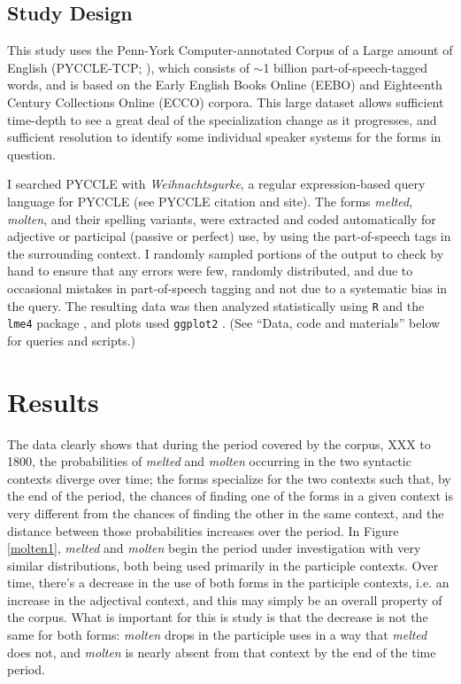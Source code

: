 \documentclass{artikel3}
\begin{document}
\subsection{Study Design}

This study uses the {P}enn-{Y}ork {C}omputer-annotated {C}orpus of a {L}arge amount of {E}nglish  (PYCCLE-TCP; \citealt{pyccle}), which consists of $\sim$1 billion part-of-speech-tagged words, and is based on the Early English Books Online (EEBO) and Eighteenth Century Collections Online (ECCO) corpora. This large dataset allows sufficient time-depth to see a great deal of the specialization change as it progresses, and sufficient resolution to identify some individual speaker systems for the forms in question.

I searched PYCCLE with \textsl{Weihnachtsgurke}, a regular expression-based query language for PYCCLE (see PYCCLE citation and site). The forms \textsl{melted}, \textsl{molten}, and their spelling variants, were extracted and coded automatically for adjective or participal (passive or perfect) use, by using the part-of-speech tags in the surrounding context. I randomly sampled portions of the output to check by hand to ensure that any errors were few, randomly distributed, and due to occasional mistakes in part-of-speech tagging and not due to a systematic bias in the query. The resulting data was then analyzed statistically using \texttt{R} and the \texttt{lme4} package \citep{lme4}, and plots used \texttt{ggplot2} \citep{ggplot2}. (See ``Data, code and materials'' below for queries and scripts.)



\section{Results}
\label{results}

The data clearly shows that during the period covered by the corpus, XXX to 1800, the probabilities of \textsl{melted} and \textsl{molten} occurring in the two syntactic contexts diverge over time; the forms specialize for the two contexts such that, by the end of the period, the chances of finding one of the forms in a given context is very different from the chances of finding the other in the same context, and the distance between those probabilities increases over the period. In Figure \ref{molten1}, \textsl{melted} and \textsl{molten} begin the period under investigation with very similar distributions, both being used primarily in the participle contexts. Over time, there's a decrease in the use of both forms in the participle contexts, i.e. an increase in the adjectival context, and this may simply be an overall property of the corpus. What is important for this is study is that the decrease is not the same for both forms: \textsl{molten} drops in the participle uses in a way that \textsl{melted} does not, and \textsl{molten} is nearly absent from that context by the end of the time period.
\end{document}
